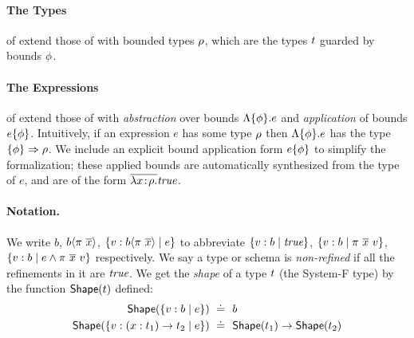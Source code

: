 \paragraph{The Types} of \boundedcorelan extend those of \corelan with
bounded types $\rho$, which are the types $t$ guarded by bounds
$\phi$.

\paragraph{The Expressions} of \boundedcorelan extend those of \corelan
with \emph{abstraction} over bounds $\Lambda \{\phi \} . e $ and
\emph{application} of bounds $ e \{ \phi \} $.
%
Intuitively, if an expression $e$ has some type $\rho$
then $\Lambda \{\phi \} . e $ has the type
$\{ {\phi} \} \Rightarrow \rho $.
%
We include an explicit bound application form
$ e \{ \phi \} $ to simplify
the formalization; these applied bounds are automatically
synthesized from the type of $e$, and are of the form
$\overline{\lambda {x\!:\!\ensuremath{\rho}}. }{\textit{true}}$.

\paragraph{Notation.}
We write
$b$,
${b \langle {\pi \ \overline{x}} \rangle}$,
$\left\lbrace v : {b \langle {\pi \ \overline{x}} \rangle}\mid e\right\rbrace$
to abbreviate
$\left\lbrace v : b\mid \textit{true}\right\rbrace$,
$\left\lbrace v : b\mid {\pi \ \overline{x}}\ v\right\rbrace$,
$\tref{b}{\reft \wedge \rvapp{\pi}{x}\ \vref}$
respectively.
We say a type or schema is \emph{non-refined} if all the
refinements in it are $\textit{true}$.
%
We get the \textit{shape} of a type $t$ (\ie the System-F type)
by the function $\mathsf{Shape}(t)$ defined:
%
\begin{align*}
\toshape{\tref{b}{\reft}} \defeq &\ b \\
\toshape{\trfun{x}{\rtyp_1}{\rtyp_2}{\reft}} \defeq &\ \toshape{\rtyp_1} \rightarrow \toshape{\rtyp_2}
\end{align*}

